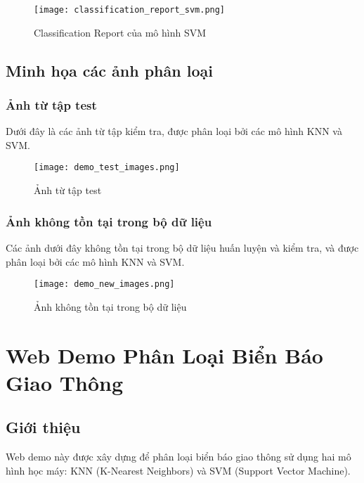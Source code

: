 \documentclass[a4paper,12pt]{article}
\begin{document}
\begin{figure}[H]
    \centering
    \texttt{[image: classification\_report\_svm.png]}
    \caption{Classification Report của mô hình SVM}
    \label{fig:svm_classification_report}
\end{figure}

\newpage
\subsection{Minh họa các ảnh phân loại}

\subsubsection{Ảnh từ tập test}

Dưới đây là các ảnh từ tập kiểm tra, được phân loại bởi các mô hình KNN và SVM.

\begin{figure}[H]
    \centering
    \texttt{[image: demo\_test\_images.png]}
    \caption{Ảnh từ tập test}
    \label{fig:test_images}
\end{figure}

\subsubsection{Ảnh không tồn tại trong bộ dữ liệu}

Các ảnh dưới đây không tồn tại trong bộ dữ liệu huấn luyện và kiểm tra, và được phân loại bởi các mô hình KNN và SVM.

\begin{figure}[H]
    \centering
    \texttt{[image: demo\_new\_images.png]}
    \caption{Ảnh không tồn tại trong bộ dữ liệu}
    \label{fig:new_images}
\end{figure}

\newpage
\section*{\centering Web Demo Phân Loại Biển Báo Giao Thông}
\vspace{1cm}
\setcounter{section}{4}
\setcounter{subsection}{0}

\subsection{Giới thiệu}
\hspace{5mm}Web demo này được xây dựng để phân loại biển báo giao thông sử dụng hai mô hình học máy: KNN (K-Nearest Neighbors) và SVM (Support Vector Machine).
\end{document}
